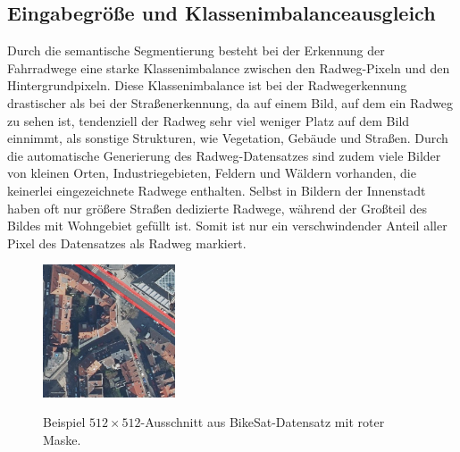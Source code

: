 \subsection{Eingabegröße und Klassenimbalanceausgleich}

Durch die semantische Segmentierung besteht bei der Erkennung der Fahrradwege eine starke 
Klassenimbalance zwischen den Radweg-Pixeln und den Hintergrundpixeln. Diese Klassenimbalance ist bei der Radwegerkennung drastischer 
als bei der Straßenerkennung, da auf einem Bild, auf dem ein Radweg zu sehen ist, 
tendenziell der Radweg sehr viel weniger Platz auf dem Bild einnimmt, als sonstige Strukturen, wie Vegetation, Gebäude und Straßen. 
Durch die automatische Generierung des Radweg-Datensatzes sind zudem viele Bilder von kleinen Orten,
Industriegebieten, Feldern und Wäldern vorhanden, die keinerlei eingezeichnete Radwege enthalten. 
Selbst in Bildern der Innenstadt haben oft nur größere Straßen dedizierte Radwege, während der 
Großteil des Bildes mit Wohngebiet gefüllt ist. 
Somit ist nur ein verschwindender Anteil aller Pixel des Datensatzes als Radweg markiert. 

\begin{figure}
	\centering
	\vspace{-30pt} %
	\includegraphics[width=0.35\textwidth]{Bilder/cut-example.jpg}
	\vspace{-10pt}
	\caption[Beispiel $512{\times}512$-Ausschnitt aus BikeSat-Datensatz.]{\unskip}
	Beispiel $512{\times}512$-Ausschnitt aus BikeSat-Datensatz mit roter Maske.
	\label{fig:cut-example}
\end{figure}

